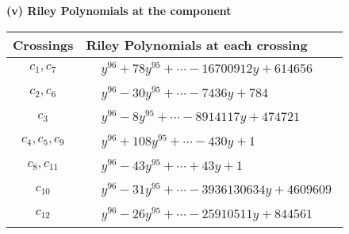 \documentclass[1p]{elsarticle_modified}
\theoremstyle{definition}
\begin{document}
\flushleft \textbf{(v) Riley Polynomials at the component}\newline \\
\begin{tabular}{m{50pt}|m{274pt}}
Crossings & \hspace{64pt}Riley Polynomials at each crossing \\
\hline $$\begin{aligned}c_{1},c_{7}\end{aligned}$$&$\begin{aligned}
&y^{96}+78 y^{95}+\cdots-16700912 y+614656
\end{aligned}$\\
\hline $$\begin{aligned}c_{2},c_{6}\end{aligned}$$&$\begin{aligned}
&y^{96}-30 y^{95}+\cdots-7436 y+784
\end{aligned}$\\
\hline $$\begin{aligned}c_{3}\end{aligned}$$&$\begin{aligned}
&y^{96}-8 y^{95}+\cdots-8914117 y+474721
\end{aligned}$\\
\hline $$\begin{aligned}c_{4},c_{5},c_{9}\end{aligned}$$&$\begin{aligned}
&y^{96}+108 y^{95}+\cdots-430 y+1
\end{aligned}$\\
\hline $$\begin{aligned}c_{8},c_{11}\end{aligned}$$&$\begin{aligned}
&y^{96}-43 y^{95}+\cdots+43 y+1
\end{aligned}$\\
\hline $$\begin{aligned}c_{10}\end{aligned}$$&$\begin{aligned}
&y^{96}-31 y^{95}+\cdots-3936130634 y+4609609
\end{aligned}$\\
\hline $$\begin{aligned}c_{12}\end{aligned}$$&$\begin{aligned}
&y^{96}-26 y^{95}+\cdots-25910511 y+844561
\end{aligned}$\\
\hline
\end{tabular}\\~\\
\end{document}
